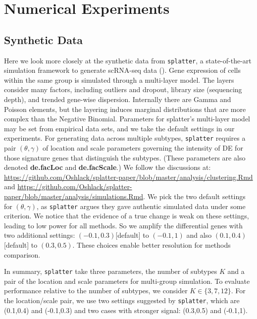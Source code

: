 \documentclass[aoas,preprint]{imsart}
\begin{document}
\clearpage

\section{Numerical Experiments}

\subsection{Synthetic Data}

Here we look more closely at the synthetic data from \verb+splatter+,
 a state-of-the-art simulation framework to generate scRNA-seq data (\cite{ref:Zappia}).
Gene expression of cells within the same group is simulated through a multi-layer model. 
The layers consider many factors, including
  outliers and dropout, library size (sequencing depth), and trended gene-wise dispersion. 
Internally there are Gamma and Poisson elements, but the layering induces marginal distributions
that are more complex than the Negative Binomial.
Parameters for splatter's multi-layer model may be set from empirical data sets, and we take the
default settings in our experiments.  For generating data across multiple subtypes, 
\verb+splatter+ requires a pair $(\theta,\gamma)$ of location and scale 
parameters governing the intensity of DE for those signature genes that distinguish the subtypes.
(These parameters are also denoted \textbf{de.facLoc} and \textbf{de.facScale}.)  
We follow  the discussions at:
\url{https://github.com/Oshlack/splatter-paper/blob/master/analysis/clustering.Rmd}
and
\url{https://github.com/Oshlack/splatter-paper/blob/master/analysis/simulations.Rmd}.
 We pick the two default settings for $(\theta,\gamma)$, 
 as \verb+splatter+ argues they gave authentic simulated data under some criterion.
We notice that the evidence of a true change  is weak on these settings,
 leading to low power for all methods. So we amplify the differential genes with two additional
settings:  $(-0.1,0.3)$[default] to $(-0.1,1)$ 
and also $(0.1,0.4)$[default] to $(0.3,0.5)$.  These choices enable better resolution for methods comparison.


In summary, \verb+splatter+ take three parameters, the number of subtypes $K$ and a
 pair of the location and scale parameters for multi-group simulation.
To evaluate performance relative to the number of subtypes,
we consider $K \in \{3,7,12\}$.
For the location/scale pair, we use two settings suggested by \verb+splatter+, 
which are (0.1,0.4) and (-0.1,0.3)  and two cases with stronger signal:
(0.3,0.5) and (-0.1,1).
\end{document}
